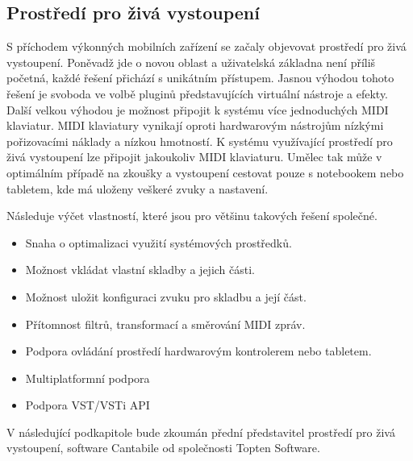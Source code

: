 \documentclass[thesis=M,czech]{FITthesis}[2019/03/06]
\begin{document}
		\subsection{Prostředí pro živá vystoupení}
			S příchodem výkonných mobilních zařízení se začaly objevovat prostředí pro živá vystoupení.
			Poněvadž jde o novou oblast a uživatelská základna není příliš početná, každé řešení přichází s unikátním přístupem. 
			Jasnou výhodou tohoto řešení je svoboda ve volbě pluginů
			představujících virtuální nástroje a efekty.
			Další velkou výhodou je možnost připojit
			k systému více jednoduchých MIDI klaviatur.
			MIDI klaviatury vynikají oproti hardwarovým nástrojům
			nízkými pořizovacími náklady a nízkou hmotností.
			K systému využívající prostředí pro živá vystoupení
			lze připojit jakoukoliv MIDI klaviaturu. Umělec
			tak může v optimálním případě na zkoušky a vystoupení cestovat pouze s notebookem nebo tabletem, kde má uloženy veškeré zvuky a nastavení.
			
			Následuje výčet vlastností, které jsou pro většinu takových řešení společné.
			
			\begin{itemize}
				\item Snaha o optimalizaci využití systémových prostředků.
				\item Možnost vkládat vlastní skladby a jejich části.
				\item Možnost uložit konfiguraci zvuku pro skladbu a její část.
				\item Přítomnost filtrů, transformací a směrování MIDI zpráv.
				\item Podpora ovládání prostředí hardwarovým kontrolerem nebo tabletem.
				\item Multiplatformní podpora
				\item Podpora VST/VSTi API
			\end{itemize}
		
			V následující podkapitole bude zkoumán přední představitel prostředí pro živá vystoupení,
			software Cantabile od společnosti Topten Software.
			
\end{document}
